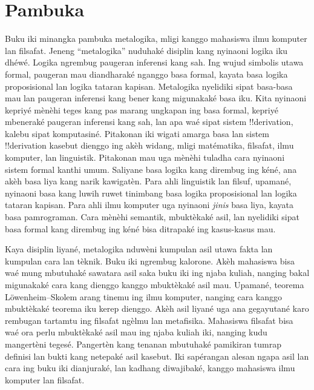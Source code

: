 \chapter{Pambuka}

Buku iki minangka pambuka metalogika, mligi kanggo mahasiswa ilmu komputer
lan filsafat. Jeneng “metalogika” nuduhaké disiplin kang nyinaoni logika
iku dhéwé. Logika ngrembug paugeran inferensi kang sah. Ing wujud simbolis
utawa formal, paugeran mau diandharaké nganggo basa formal, kayata basa
logika proposisional lan logika tataran kapisan. Metalogika nyelidiki sipat
basa-basa mau lan paugeran inferensi kang bener kang migunakaké basa iku.
Kita nyinaoni kepriyé mènèhi teges kang pas marang ungkapan ing basa formal,
kepriyé mbeneraké paugeran inferensi kang sah, lan apa waé sipat sistem
!!{derivation}, kalebu sipat komputasiné. Pitakonan iki wigati amarga basa
lan sistem !!{derivation} kasebut dienggo ing akèh widang, mligi matématika,
filsafat, ilmu komputer, lan linguistik. Pitakonan mau uga mènèhi tuladha
cara nyinaoni sistem formal kanthi umum. Saliyane basa logika kang
dirembug ing kéné, ana akèh basa liya kang narik kawigatèn. Para ahli
linguistik lan filsuf, upamané, nyinaoni basa kang luwih ruwet tinimbang
basa logika proposisional lan logika tataran kapisan. Para ahli ilmu
komputer uga nyinaoni \emph{jinis} basa liya, kayata basa pamrograman.
Cara mènèhi semantik, mbuktèkaké asil, lan nyelidiki sipat basa formal kang
dirembug ing kéné bisa ditrapaké ing kasus-kasus mau.

Kaya disiplin liyané, metalogika nduwèni kumpulan asil utawa fakta lan
kumpulan cara lan tèknik. Buku iki ngrembug kalorone. Akèh mahasiswa
bisa waé mung mbutuhaké sawatara asil saka buku iki ing njaba kuliah,
nanging bakal migunakaké cara kang dienggo kanggo mbuktèkaké asil mau.
Upamané, teorema L\"owenheim--Skolem arang tinemu ing ilmu komputer,
nanging cara kanggo mbuktèkaké teorema iku kerep dienggo. Akèh asil
liyané uga ana gegayutané karo rembugan tartamtu ing filsafat ngèlmu
lan metafisika. Mahasiswa filsafat bisa waé ora perlu mbuktèkaké asil
mau ing njaba kuliah iki, nanging kudu mangertèni tegesé. Pangertèn
kang tenanan mbutuhaké pamikiran tumrap definisi lan bukti kang
netepaké asil kasebut. Iki sapérangan alesan ngapa asil lan cara ing
buku iki dianjuraké, lan kadhang diwajibaké, kanggo mahasiswa ilmu
komputer lan filsafat.

